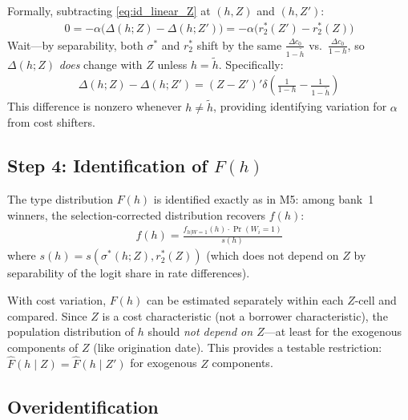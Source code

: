 \documentclass[12pt]{article}
\theoremstyle{plain}
\theoremstyle{plain}
\theoremstyle{definition}  %
\theoremstyle{remark}  %
\begin{document}
\medskip\noindent
Formally, subtracting \eqref{eq:id_linear_Z} at $(h, Z)$ and $(h, Z')$:
\begin{align}\label{eq:alpha_from_Z}
    0 = -\alpha\big(\Delta(h; Z) - \Delta(h; Z')\big) = -\alpha\big(r_2^*(Z') - r_2^*(Z)\big)
\end{align}
Wait---by separability, both $\sigma^*$ and $r_2^*$ shift by the same $\frac{\Delta c_0}{1-\tilde{h}}$ vs.\ $\frac{\Delta c_0}{1-h}$, so $\Delta(h;Z)$ \emph{does} change with $Z$ unless $h = \tilde{h}$. Specifically:
\begin{align*}
    \Delta(h; Z) - \Delta(h; Z') = (Z-Z')'\delta \left(\frac{1}{1-h} - \frac{1}{1-\tilde{h}}\right)
\end{align*}
This difference is nonzero whenever $h \neq \tilde{h}$, providing identifying variation for $\alpha$ from cost shifters.

\subsection{Step 4: Identification of $F(h)$}

The type distribution $F(h)$ is identified exactly as in M5: among bank~1 winners, the selection-corrected distribution recovers $f(h)$:
\begin{align*}
    f(h) = \frac{f_{h|W=1}(h) \cdot \Pr(W_i = 1)}{s(h)}
\end{align*}
where $s(h) = s(\sigma^*(h; Z), r_2^*(Z))$ (which does not depend on $Z$ by separability of the logit share in rate differences).

\medskip\noindent
With cost variation, $F(h)$ can be estimated separately within each $Z$-cell and compared. Since $Z$ is a cost characteristic (not a borrower characteristic), the population distribution of $h$ should \emph{not depend on $Z$}---at least for the exogenous components of $Z$ (like origination date). This provides a testable restriction: $\hat{F}(h \mid Z) = \hat{F}(h \mid Z')$ for exogenous $Z$ components.

\subsection{Overidentification}
\end{document}
